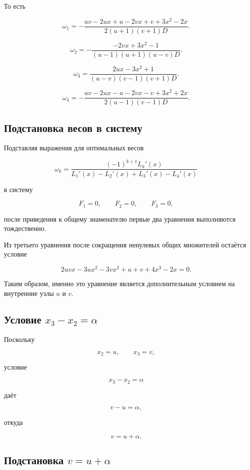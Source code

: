 \documentclass[12pt,a4paper]{article}
\begin{document}
	То есть
	
	$$
	\boxed{
		\omega_1=
		-\frac{
			uv-2ux+u-2vx+v+3x^2-2x
		}{
			2(u+1)(v+1)D
		}.
	}
	$$
	
	$$
	\boxed{
		\omega_2=
		-\frac{
			-2vx+3x^2-1
		}{
			(u-1)(u+1)(u-v)D
		}.
	}
	$$
	
	$$
	\boxed{
		\omega_3=
		\frac{
			2ux-3x^2+1
		}{
			(u-v)(v-1)(v+1)D
		}.
	}
	$$
	
	$$
	\boxed{
		\omega_4=
		-\frac{
			uv-2ux-u-2vx-v+3x^2+2x
		}{
			2(u-1)(v-1)D
		}.
	}
	$$
	
	\subsection{Подстановка весов в систему}
	
	
	Подставляя выражения для оптимальных весов
	
	$$
	\omega_k=
	\frac{(-1)^{k+1}L_k'(x)}
	{L_1'(x)-L_2'(x)+L_3'(x)-L_4'(x)}
	$$
	
	в систему
	
	$$
	F_1=0,\qquad F_2=0,\qquad F_3=0,
	$$
	
	после приведения к общему знаменателю первые два уравнения выполняются тождественно.
	
	Из третьего уравнения после сокращения ненулевых общих множителей остаётся условие
	
	$$
	\boxed{
		2uvx
		-3ux^2
		-3vx^2
		+u+v
		+4x^3-2x
		=0.
	}
	$$
	
	Таким образом, именно это уравнение является дополнительным условием на внутренние узлы $u$ и $v$.
	
	\subsection{Условие $x_3-x_2=\alpha$}
	
	Поскольку
	
	$$
	x_2=u,\qquad x_3=v,
	$$
	
	условие
	
	$$
	x_3-x_2=\alpha
	$$
	
	даёт
	
	$$
	v-u=\alpha,
	$$
	
	откуда
	
	$$
	\boxed{
		v=u+\alpha.
	}
	$$
	
	\subsection{Подстановка $v=u+\alpha$}
	
\end{document}
